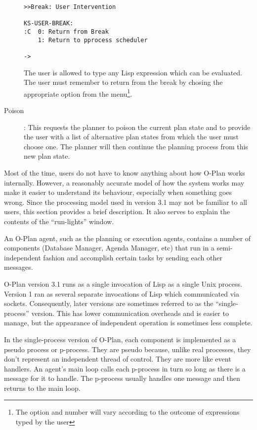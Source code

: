 \begin{description}
\begin{verbatim} 
>>Break: User Intervention

KS-USER-BREAK:
:C  0: Return from Break
    1: Return to pprocess scheduler

->
\end{verbatim}

The user is allowed to type any Lisp expression which can be
evaluated. The user must remember to return from the break by chosing
the appropriate option from the menu\footnote{The option and number
will vary according to the outcome of expressions typed by the user}.  

\item[Poison]: This requests the planner to poison the current plan
state and to provide the user with a list of alternative plan states
from which the user must choose one. The planner will then continue
the planning process from this new plan state. 
\end{description}

Most of the time, users do not have to know anything about how O-Plan
works internally.  However, a reasonably accurate model of how the
system works may make it easier to understand its behaviour,
especially when something goes wrong.  Since the processing model used
in version 3.1 may not be familiar to all users, this section provides
a brief description.  It also serves to explain the contents of the
``run-lights'' window.

An O-Plan agent, such as the planning or execution agents,
contains a number of components (Database Manager, Agenda Manager,
etc) that run in a semi-independent fashion and accomplish certain
tasks by sending each other messages.

O-Plan version 3.1 runs as a single invocation of Lisp as a single
Unix process.  Version 1 ran as several separate invocations of Lisp
which communicated via sockets.  Consequently, later versions are
sometimes referred to as the ``single-process'' version.  This has
lower communication overheads and is easier to manage, but the
appearance of independent operation is sometimes less complete.

In the single-process version of O-Plan, each component is
implemented as a pseudo process or p-process.  They are pseudo
because, unlike real processes, they don't represent an independent
thread of control.  They are more like event handlers.  An agent's
main loop calls each p-process in turn so long as there is a message
for it to handle.  The p-process usually handles one message and then
returns to the main loop.

